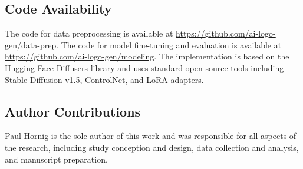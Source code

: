 \subsection*{Code Availability}
The code for data preprocessing is available at \url{https://github.com/ai-logo-gen/data-prep}. The code for model fine-tuning and evaluation is available at \url{https://github.com/ai-logo-gen/modeling}. The implementation is based on the Hugging Face Diffusers library and uses standard open-source tools including Stable Diffusion v1.5, ControlNet, and LoRA adapters.


\subsection*{Author Contributions}
Paul Hornig is the sole author of this work and was responsible for all aspects of the research, including study conception and design, data collection and analysis, and manuscript preparation.


